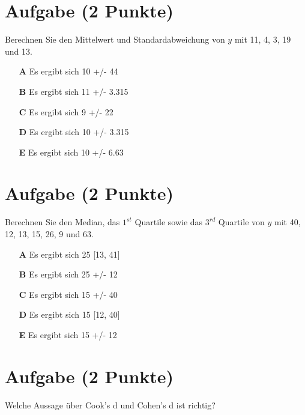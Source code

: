 \documentclass[a4paper, 10pt]{scrartcl}\usepackage[]{graphicx}\usepackage[]{xcolor}
\begin{document}
\section{Aufgabe \hfill (2 Punkte)}




Berechnen Sie den Mittelwert und Standardabweichung von $y$ mit 11, 4, 3, 19 und 13.



\begin{enumerate}
\item [\textbf{A} \msquare] Es ergibt sich 10 +/- 44
\item [\textbf{B} \msquare] Es ergibt sich 11 +/- 3.315
\item [\textbf{C} \msquare] Es ergibt sich 9 +/- 22
\item [\textbf{D} \msquare] Es ergibt sich 10 +/- 3.315
\item [\textbf{E} \msquare] Es ergibt sich 10 +/- 6.63
\end{enumerate} 

\section{Aufgabe \hfill (2 Punkte)}




Berechnen Sie den Median, das $1^{st}$ Quartile sowie das $3^{rd}$ Quartile von $y$ mit 40, 12, 13, 15, 26, 9 und 63.



\begin{enumerate}
\item [\textbf{A} \msquare] Es ergibt sich 25 [13, 41]
\item [\textbf{B} \msquare] Es ergibt sich 25 +/- 12
\item [\textbf{C} \msquare] Es ergibt sich 15 +/- 40
\item [\textbf{D} \msquare] Es ergibt sich 15 [12, 40]
\item [\textbf{E} \msquare] Es ergibt sich 15 +/- 12
\end{enumerate} 

\section{Aufgabe \hfill (2 Punkte)}

Welche Aussage {\"u}ber Cook's d und Cohen's d ist richtig? 
\end{document}
